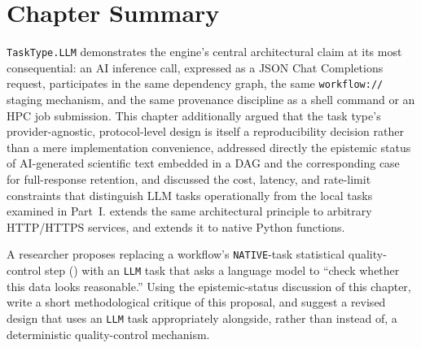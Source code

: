 \section{Chapter Summary}

\texttt{TaskType.LLM} demonstrates the engine's central architectural claim
at its most consequential: an AI inference call, expressed as a JSON Chat
Completions request, participates in the same dependency graph, the same
\texttt{workflow://} staging mechanism, and the same provenance discipline as
a shell command or an HPC job submission. This chapter additionally argued
that the task type's provider-agnostic, protocol-level design is itself a
reproducibility decision rather than a mere implementation convenience,
addressed directly the epistemic status of AI-generated scientific text
embedded in a DAG and the corresponding case for full-response retention,
and discussed the cost, latency, and rate-limit constraints that distinguish
LLM tasks operationally from the local tasks examined in Part~I.
 extends the same architectural principle to arbitrary
HTTP/HTTPS services, and  extends it to native Python
functions.

\begin{exercise}
A researcher proposes replacing a workflow's \texttt{NATIVE}-task
statistical quality-control step () with an
\texttt{LLM} task that asks a language model to ``check whether this data
looks reasonable.'' Using the epistemic-status discussion of this chapter,
write a short methodological critique of this proposal, and suggest a
revised design that uses an \texttt{LLM} task appropriately alongside,
rather than instead of, a deterministic quality-control mechanism.
\end{exercise}
